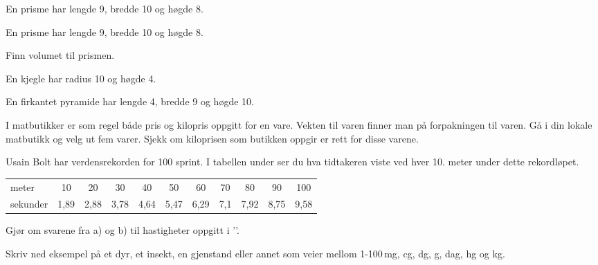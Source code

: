 \nes

En prisme har lengde 9, bredde 10 og høgde 8.

En prisme har lengde 9, bredde 10 og høgde 8.\os

Finn volumet til prismen.


En kjegle har radius 10 og høgde 4.

En firkantet pyramide har lengde 4, bredde 9 og høgde 10.

\nes

I matbutikker er som regel både pris og kilopris oppgitt for en vare. Vekten til varen finner man på forpakningen til varen. Gå i din lokale matbutikk og velg ut fem varer. Sjekk om kiloprisen som butikken oppgir er rett for disse varene.

Usain Bolt har verdensrekorden for 100 sprint. I tabellen under ser du hva tidtakeren viste ved hver 10. meter under dette rekordløpet. \vs
\begin{center}\small
	\begin{tabular}{l|c|c|c|c|c|c|c|c|c|c}
meter & 10 & 20 & 30 & 40 & 50 & 60 & 70 & 80 & 90 & 100\\
sekunder& 1,89 & 2,88 & 3,78 & 4,64 & 5,47 & 6,29 & 7,1 & 7,92 & 8,75 & 9,58
\end{tabular}
\end{center}

\nes
{}
Gjør om svarene fra  a) og b) til hastigheter oppgitt i ''. 

Skriv ned eksempel på et dyr, et insekt, en gjenstand eller annet som veier mellom 1-100\,mg, cg, dg, g, dag, hg og kg.



